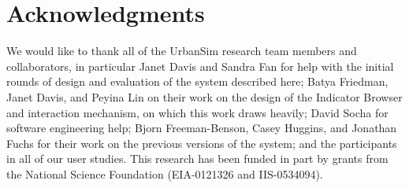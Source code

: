 
\section*{Acknowledgments}

We would like to thank all of the UrbanSim research team members and
collaborators, in particular Janet Davis and Sandra Fan for help with the
initial rounds of design and evaluation of the system described here; Batya
Friedman, Janet Davis, and Peyina Lin on their work on the design of the
Indicator Browser and interaction mechanism, on which this work draws
heavily; David Socha for software engineering help; Bjorn Freeman-Benson,
Casey Huggins, and Jonathan Fuchs for their work on the previous versions
of the system; and the participants in all of our user studies.  This
research has been funded in part by grants from the National Science
Foundation (EIA-0121326 and IIS-0534094).

